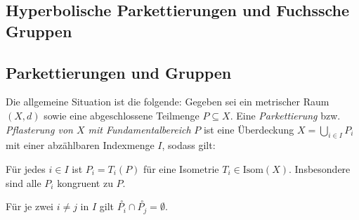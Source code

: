 \documentclass[11pt]{book}
\numberwithin{dummy}{section}
\theoremstyle{nonumberbreak}
\begin{document}
\begin{spacing}{1.4}










































\newpage
\thispagestyle{empty}












\chapter{Hyperbolische Parkettierungen und Fuchssche Gruppen} %
\setlength\abovedisplayshortskip{0pt}
\setlength\belowdisplayshortskip{10pt}
\setlength\abovedisplayskip{10pt}
\setlength\belowdisplayskip{10pt}
 



\section{Parkettierungen und Gruppen} %

\thispagestyle{empty}


Die allgemeine Situation ist die folgende: Gegeben sei ein metrischer Raum $(X,d)$ sowie eine abgeschlossene Teilmenge $P\subseteq X$. Eine \textit{Parkettierung} bzw. \textit{Pflasterung von $X$ mit Fundamentalbereich} $P$ ist eine Überdeckung $X= \bigcup_{i \in I} P_i$ mit einer abzählbaren Indexmenge $I$, sodass gilt:
\begin{compactenum}
\item Für jedes $i \in I$ ist $P_i= T_i(P)$ für eine Isometrie $T_i \in \mathrm{Isom}(X)$. Insbesondere sind alle $P_i$ kongruent zu $P$.
\item Für je zwei $i \neq j$ in $I$ gilt $\overset{\circ}{P_i} \cap \overset{\circ}{P_j} = \emptyset$. 


\end{compactenum}
\end{spacing}
\end{document}
